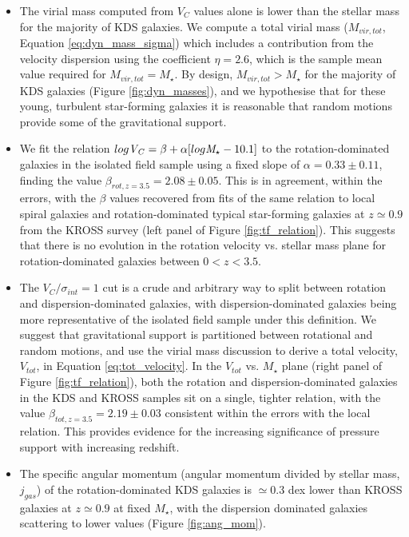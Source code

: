 \documentclass[fleqn,usenatbib]{mnras}
\begin{document}
\begin{itemize}
    \item The virial mass computed from $V_{C}$ values alone is lower than the stellar mass for the majority of KDS galaxies.
    We compute a total virial mass ($M_{vir,tot}$, Equation \ref{eq:dyn_mass_sigma}) which includes a contribution from the velocity dispersion using the coefficient $\eta=2.6$, which is the sample mean value required for $M_{vir,tot}=M_{\star}$.
    By design, $M_{vir,tot} > M_{\star}$ for the majority of KDS galaxies (Figure \ref{fig:dyn_masses}), and we hypothesise that for these young, turbulent star-forming galaxies it is reasonable that random motions provide some of the gravitational support.
    \item We fit the relation $log{\it V_{C}} = \beta + \alpha[log{\it M_{\star}} - 10.1]$ to the rotation-dominated galaxies in the isolated field sample using a fixed slope of $\alpha=0.33\pm0.11$, finding the value $\beta_{rot,z=3.5} = 2.08\pm0.05$.
    This is in agreement, within the errors, with the $\beta$ values recovered from fits of the same relation to local spiral galaxies and rotation-dominated typical star-forming galaxies at $z\simeq0.9$ from the KROSS survey (left panel of Figure \ref{fig:tf_relation}).
    This suggests that there is no evolution in the rotation velocity vs. stellar mass plane for rotation-dominated galaxies between $0 < z < 3.5$.  
    \item The $V_{C}/\sigma_{int} = 1$ cut is a crude and arbitrary way to split between rotation and dispersion-dominated galaxies, with dispersion-dominated galaxies being more representative of the isolated field sample under this definition.
    We suggest that gravitational support is partitioned between rotational and random motions, and use the virial mass discussion to derive a total velocity, $V_{tot}$, in Equation \ref{eq:tot_velocity}.
    In the $V_{tot}$ vs. $M_{\star}$ plane (right panel of Figure \ref{fig:tf_relation}), both the rotation and dispersion-dominated galaxies in the KDS and KROSS samples sit on a single, tighter relation, with the value $\beta_{tot,z=3.5} = 2.19\pm0.03$ consistent within the errors with the local relation.
    This provides evidence for the increasing significance of pressure support with increasing redshift.
    \item The specific angular momentum (angular momentum divided by stellar mass, $j_{gas}$) of the rotation-dominated KDS galaxies is $\simeq$0.3 dex lower than KROSS galaxies at $z\simeq0.9$ at fixed $M_{\star}$, with the dispersion dominated galaxies scattering to lower values (Figure \ref{fig:ang_mom}).

\end{itemize}
\end{document}
